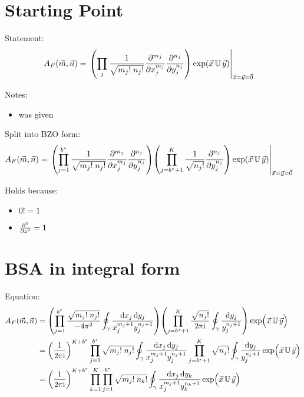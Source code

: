 \documentclass[
	english,
	a4paper,
	fontsize=10pt,
	parskip=half,
	titlepage=true,
	DIV=12,
	final
]{scrreprt}
\newcommand*{\iunit}{\ensuremath{\mathrm{i}}}
\begin{document}
\section{Starting Point}
Statement:
\begin{align}
	A_F(\vec{m}, \vec{n})
&=
	\eval{\qty(
			\prod_{j}
			\frac
				{1}
				{\sqrt{m_j! \; n_j!}}
			\pdv[m_j]{x_j}
			\pdv[n_j]{y_j}
		) \exp(\vec{x} \, \mathbb{U} \, \vec{y})
	}_{\vec{x} = \vec{y} = \vec{0}}
\label{eqn:BSA_raw}
\end{align}

Notes:
\begin{itemize}
\item was given
\end{itemize}

Split into BZO form:
\begin{align}
	A_F(\vec{m}, \vec{n})
&=
	\eval{
		\qty(
			\prod_{j=1}^{b^*}
			\frac
				{1}
				{\sqrt{m_j! \; n_j!}}
			\pdv[m_j]{x_j}
			\pdv[n_j]{y_j}
		)
		\qty(
			\prod_{j=b^* + 1}^{K}
			\frac
				{1}
				{\sqrt{n_j!}}
			\pdv[n_j]{y_j}
		)
		\exp(\vec{x} \, \mathbb{U} \, \vec{y})
	}_{\vec{x} = \vec{y} = \vec{0}}
\label{eqn:BSA_raw_BZO}
\end{align}

Holds because:
\begin{itemize}
\item $0! = 1$
\item $\pdv[0]{z} = 1$
\end{itemize}

\section{BSA in integral form}
Equation:
\begin{align}
	A_F(\vec{m}, \vec{n})
&=
	\qty(
		\prod_{j=1}^{b^*}
			\frac
				{\sqrt{m_j! \; n_j!}}
				{-4\pi^{2}}
			\oint_{\gamma}
				\frac
					{\dd{x_j} \dd{y_j}}
					{x_j^{m_j+1}  y_j^{n_j+1}}
	)
	\qty(
		\prod_{j=b^* + 1}^{K}
			\frac
				{\sqrt{n_j !}}
				{2\pi\iunit}
			\oint_{\gamma}
				\frac
					{\dd{y_j}}
					{y_j^{n_j + 1}}
	)
	\exp( \Big. \vec{x} \, \mathbb{U} \, \vec{y}) \\
&=
	\qty(
		\frac{1}{2\pi\iunit}
	)^{K + b^*}
		\prod_{j=1}^{b^*}
			\sqrt{m_j! \; n_j!}
			\oint_{\gamma}
				\frac
					{\dd{x_j} \dd{y_j}}
					{x_j^{m_j+1}  y_j^{n_j+1}}
		\prod_{j=b^* + 1}^{K}
			\sqrt{n_j !}
			\oint_{\gamma}
				\frac
					{\dd{y_j}}
					{y_j^{n_j + 1}}
	\exp( \Big. \vec{x} \, \mathbb{U} \, \vec{y}) \\
&=
	\qty(
		\frac{1}{2\pi\iunit}
	)^{K + b^*}
	\prod_{k=1}^{K}
	\prod_{j=1}^{b^*}
		\sqrt{m_j! \; n_k!}
		\oint_{\gamma}
			\frac
				{\dd{x_j} \dd{y_k}}
				{x_j^{m_j+1}  y_k^{n_k+1}}
	\exp( \Big. \vec{x} \, \mathbb{U} \, \vec{y})
	\label{eqn:BSA_Int_BZO}
\end{align}
\end{document}
